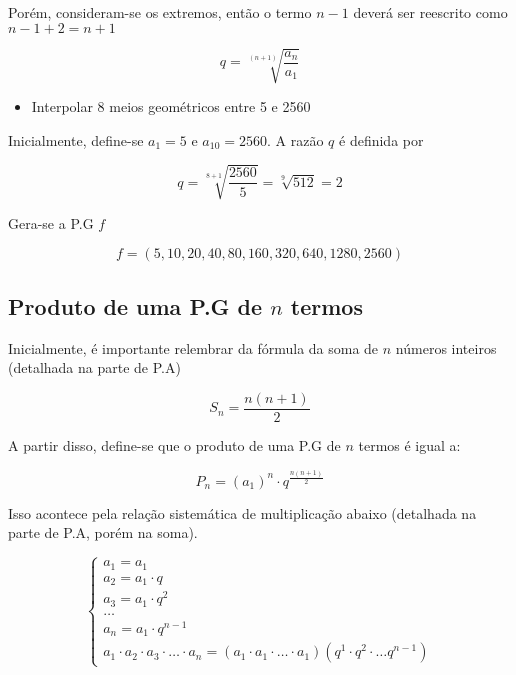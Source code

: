 \documentclass[11pt]{article}
\begin{document}
Porém, consideram-se os extremos, então o termo $n - 1$ deverá ser reescrito como $n - 1 + 2 = n + 1$

\begin{tcolorbox}[colback=LightYellow]
\[q = \sqrt[(n + 1)]{\frac{a_{n}}{a_{1}}}\]
\end{tcolorbox}

\begin{tcolorbox}[colback=LightYellow]
\begin{itemize}
        \item Interpolar 8 meios geométricos entre 5 e 2560
\end{itemize}
\end{tcolorbox}


\begin{tcolorbox}[colback=LightYellow]
  Inicialmente, define-se $a_{1} = 5$ e $a_{10} = 2560$. A razão $q$ é definida por

  \[q = \sqrt[8 + 1]{\frac{2560}{5}} = \sqrt[9]{512} = 2\]

  Gera-se a P.G $f$

  \[f = (5 , 10, 20, 40, 80, 160, 320, 640, 1280, 2560)\]
\end{tcolorbox}

\subsection{Produto de uma P.G de $n$ termos}

Inicialmente, é importante relembrar da fórmula da soma de $n$ números inteiros (detalhada na parte de P.A)

\begin{tcolorbox}[colback=LightYellow]
\[S_{n} = \frac{n(n + 1)}{2}\]
\end{tcolorbox}

A partir disso, define-se que o produto de uma P.G de $n$ termos é igual a:

\begin{tcolorbox}[colback=LightYellow]
\[P_{n} = (a_{1})^{n} \cdot q^{\frac{n(n + 1)}{2}}\]
\end{tcolorbox}

Isso acontece pela relação sistemática de multiplicação abaixo (detalhada na parte de P.A, porém na soma).

\begin{tcolorbox}[colback=LightYellow]
\begin{equation*}
\begin{cases}
  a_{1} = a_{1} \\
  a_{2} = a_{1}\cdot q \\
  a_{3} = a_{1}\cdot q^{2} \\
  \dots \\
  a_{n} = a_{1} \cdot q^{n - 1} \\
  \hline
  a_{1}\cdot a_{2}\cdot a_{3}\cdot \dots \cdot a_{n} = (a_{1}\cdot a_{1}\cdot \dots \cdot a_{1})(q^{1}\cdot q^{2}\cdot \dots q^{n - 1})
\end{cases}
\end{equation*}
\end{tcolorbox}
\end{document}
